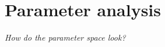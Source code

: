 

\section{Parameter analysis}\label{sec:parameters}

\textit{How do the parameter space look?}


\newpage


\newpage

